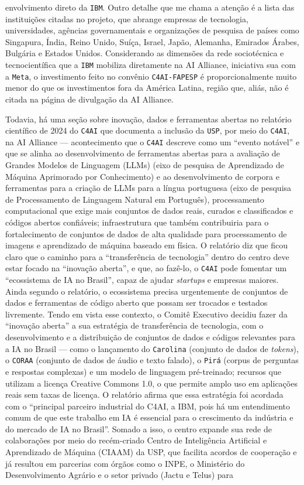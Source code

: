 envolvimento direto da \texttt{IBM}. Outro detalhe que me chama a atenção é a lista das instituições citadas no projeto, que abrange empresas de tecnologia, universidades, agências governamentais e organizações de pesquisa de países como Singapura, Índia, Reino Unido, Suíça, Israel, Japão, Alemanha, Emirados Árabes, Bulgária e Estados Unidos. Considerando as dimensões da rede sociotécnica e tecnocientífica que a \texttt{IBM} mobiliza diretamente na AI Alliance, iniciativa sua com a \texttt{Meta}, o investimento feito no convênio \texttt{C4AI-FAPESP} é proporcionalmente muito menor do que os investimentos fora da América Latina, região que, aliás, não é citada na página de divulgação da AI Alliance. 

Todavia, há uma seção sobre inovação, dados e ferramentas abertas no relatório científico de 2024 do \texttt{C4AI} que documenta a inclusão da \texttt{USP}, por meio do \texttt{C4AI}, na AI Alliance --- acontecimento que o \texttt{C4AI} descreve como um \enquote{evento notável} e que se alinha ao desenvolvimento de ferramentas abertas para a avaliação de Grandes Modelos de Linguagem (LLMs) (eixo de pesquisa de Aprendizado de Máquina Aprimorado por Conhecimento) e ao desenvolvimento de corpora e ferramentas para a criação de LLMs para a língua portuguesa (eixo de pesquisa de Processamento de Linguagem Natural em Português), processamento computacional que exige mais conjuntos de dados reais, curados e classificados e códigos abertos confiáveis; infraestrutura que também contribuiria para o fortalecimento de conjuntos de dados de alta qualidade para processamento de imagens e aprendizado de máquina baseado em física. O relatório diz que ficou claro que o caminho para a \enquote{transferência de tecnologia} dentro do centro deve estar focado na \enquote{inovação aberta}, e que, ao fazê-lo, o \texttt{C4AI} pode fomentar um \enquote{ecossistema de IA no Brasil}, capaz de ajudar \emph{startups} e empresas maiores. Ainda segundo o relatório, o ecossistema precisa urgentemente de conjuntos de dados e ferramentas de código aberto que possam ser trocados e testados livremente. Tendo em vista esse contexto, o Comitê Executivo decidiu fazer da \enquote{inovação aberta} a sua estratégia de transferência de tecnologia, com o desenvolvimento e a distribuição de conjuntos de dados e códigos relevantes para a IA no Brasil --- como o lançamento do \texttt{Carolina} (conjunto de dados de \emph{tokens}), o \texttt{CORAA} (conjunto de dados de áudio e texto falado), o \texttt{Pirá} (corpus de perguntas e respostas complexas) e um modelo de linguagem pré-treinado; recursos que utilizam a licença Creative Commons 1.0, o que permite amplo uso em aplicações reais sem taxas de licença. O relatório afirma que essa estratégia foi acordada com o \enquote{principal parceiro industrial do C4AI, a IBM, pois há um entendimento comum de que este trabalho em IA é essencial para o crescimento da indústria e do mercado de IA no Brasil}. Somado a isso, o centro expande sua rede de colaborações por meio do recém-criado Centro de Inteligência Artificial e Aprendizado de Máquina (CIAAM) da USP, que facilita acordos de cooperação e já resultou em parcerias com órgãos como o INPE, o Ministério do Desenvolvimento Agrário e o setor privado (Jactu e Telus) para 